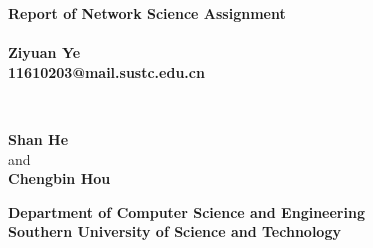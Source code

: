 \documentclass[titlepage,a4paper,12pt,thmsb]{report}
\begin{document}
\begin{titlepage}
\thispagestyle{empty}
\begin{center}
{\LARGE \bf{Report of Network Science Assignment}} \\
\vspace{1.5cm}
\large {} \\
\vspace{0.3cm}
\rm
{\large \bf {Ziyuan Ye}}\\
\vspace{0.3cm}
\bf{11610203@mail.sustc.edu.cn} \\

\vspace{1cm}

{\large{}} \\
\vspace{.5cm}

\hspace{.05cm} {\bf {Shan He}}\\
\hspace{.05cm} {\sc and}\\
\hspace{.05cm} {\bf {Chengbin Hou}}\\

\begin{figure}[h]
{\par}
\end{figure}
\large{\bf Department of Computer Science and Engineering} \\
\vskip 0.5cm
\Large{\bf Southern University of Science and Technology}\\
{\centering {}}
\end{center}
\pagebreak
\end{titlepage}
\end{document}
